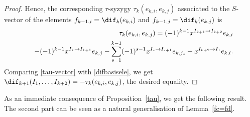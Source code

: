 \begin{proof}
Hence, the corresponding $\tau$-syzygy $\tau_{k}(e_{k,i},e_{k,j})$
associated to the $S$-vector of the elements
$f_{k-1,i}=\dif_{k}(e_{k,i})$ and $f_{k-1,j}=\dif_{k}(e_{k,j})$ is
\begin{eqnarray}\label{tau-vector}
&& \tau_{k}(e_{k,i},e_{k,j})=(-1)^{k-1}x^{I_{k+1}\to
  I_{k+2}}e_{k,i}\\ && - (-1)^{k-1}x^{I_{k}\to
  I_{k+1}}e_{k,j} -\sum_{s=1}^{k-1}(-1)^{s-1}x^{I_s\to
  I_{s+1}}e_{k,j_s}+x^{I_{k+2}\to I_1}e_{k,l}. \notag
\end{eqnarray}
Comparing \eqref{tau-vector} with \eqref{difbasisele}, we get
$\dif_{k+1}(I_1,\ldots,I_{k+2})=-\tau_{k}(e_{k,i},e_{k,j})$, the
desired equality. 
\end{proof}

As an immediate consequence of Proposition~\ref{tau}, we get the
following result. The second part can be seen as a natural
generalisation of Lemma~\ref{fc=fd}.


